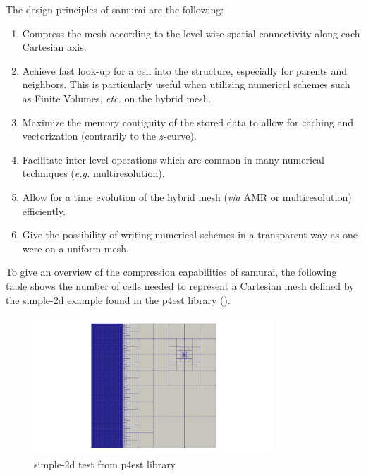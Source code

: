 The design principles of samurai are the following:
\begin{enumerate}
    \item Compress the mesh according to the level-wise spatial connectivity along each Cartesian axis.
    \item Achieve fast look-up for a cell into the structure, especially for parents and neighbors. This is particularly useful when utilizing numerical schemes such as Finite Volumes, \emph{etc.} on the hybrid mesh.
    \item Maximize the memory contiguity of the stored data to allow for caching and vectorization (contrarily to the $z$-curve).
    \item Facilitate inter-level operations which are common in many numerical techniques (\emph{e.g.} multiresolution).
    \item Allow for a time evolution of the hybrid mesh (\emph{via} AMR or multiresolution)  efficiently.
    \item Give the possibility of writing numerical schemes in a transparent way as one were on a uniform mesh.
\end{enumerate}

To give an overview of the compression capabilities of samurai, the following table shows the number of cells needed to represent a Cartesian mesh defined by the simple-2d example found in the p4est library (\cite{burstedde_p4est_2011}).

\begin{figure}[h!]
    \centering
    \includegraphics[width=0.8\textwidth]{graphics/samurai/p4est_3.png}
    \caption{simple-2d test from p4est library}
\end{figure}


